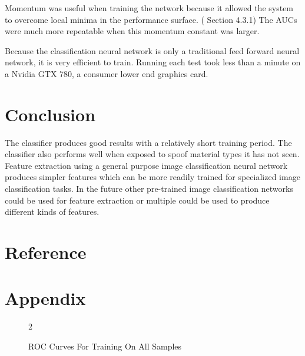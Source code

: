 \documentclass[]{article}
\begin{document}
Momentum was useful when training the network because it allowed the system to overcome local minima in the performance surface. (\cite{book} Section 4.3.1) The AUCs were much more repeatable when this momentum constant was larger.

Because the classification neural network is only a traditional feed forward neural network, it is very efficient to train. Running each test took less than a minute on a Nvidia GTX 780, a consumer lower end graphics card. 
\section{Conclusion}
The classifier produces good results with a relatively short training period. The classifier also performs well when exposed to spoof material types it has not seen. Feature extraction using a general purpose image classification neural network produces simpler features which can be more readily trained for specialized image classification tasks. In the future other pre-trained image classification networks could be used for feature extraction or multiple could be used to produce different kinds of features.
\section{Reference}


\section{Appendix}

\newpage

\begin{figure}2
     \hfill
     \caption{ROC Curves For Training On All Samples}
     \label{fig:dummy}
   \end{figure}
\end{document}
